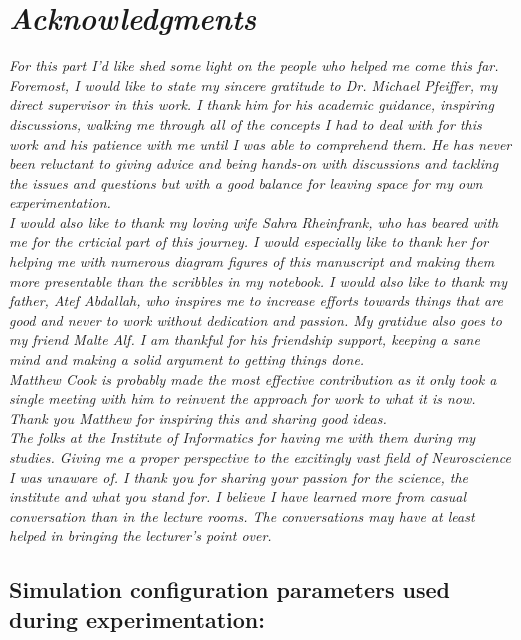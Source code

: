 \documentclass{report}
\begin{document}
\chapter{\textit{Acknowledgments}}

\textit{For this part I'd like shed some light on the people who helped me come this far.}\\
\textit{Foremost, I would like to state my sincere gratitude to Dr. Michael Pfeiffer, my direct supervisor in this work. I thank him for his academic guidance, inspiring discussions, walking me through all of the concepts I had to deal with for this work and his patience with me until I was able to comprehend them. He has never been reluctant to giving advice and being hands-on with discussions and tackling the issues and questions but with a good balance for leaving space for my own experimentation.}\\

\textit{I would also like to thank my loving wife Sahra Rheinfrank, who has beared with me for the crticial part of this journey. I would especially like to thank her for helping me with numerous diagram figures of this manuscript and making them more presentable than the scribbles in my notebook. I would also like to thank my father, Atef Abdallah, who inspires me to increase efforts towards things that are good and never to work without dedication and passion.
My gratidue also goes to my friend Malte Alf. I am thankful for his friendship support, keeping a sane mind and making a solid argument to getting things done.}\\

\textit{Matthew Cook is probably made the most effective contribution as it only took a single meeting with him to reinvent the approach for work to what it is now. Thank you Matthew for inspiring this and sharing good ideas.}\\

\textit{The folks at the Institute of Informatics for having me with them during my studies. Giving me a proper perspective to the excitingly vast field of Neuroscience I was unaware of. I thank you for sharing your passion for the science, the institute and what you stand for. I believe I have learned more from casual conversation than in the lecture rooms. The conversations may have at least helped in bringing the lecturer's point over.}

\appendix

\section{Simulation configuration parameters used during experimentation:}
\end{document}
